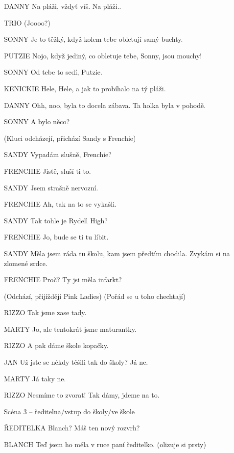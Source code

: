 DANNY                Na pláži, vždyť víš. Na pláži..

TRIO                (Joooo?)

SONNY                Je to těžký, když kolem tebe obletují samý buchty.

PUTZIE                Nojo, když jediný, co obletuje tebe, Sonny, jsou mouchy!

SONNY                Od tebe to sedí, Putzie.

KENICKIE                Hele, Hele, a jak to probíhalo na tý pláži. 

DANNY                Ohh, noo, byla to docela zábava. Ta holka byla v pohodě.

SONNY                A bylo něco?

(Kluci odcházejí, přichází Sandy s Frenchie)





SANDY                Vypadám slušně, Frenchie?

FRENCHIE                Jistě, sluší ti to.

SANDY                Jsem strašně nervozní.

FRENCHIE                Ah, tak na to se vykašli.

SANDY                Tak tohle je Rydell High?

FRENCHIE                Jo, bude se ti tu líbit.

SANDY                Měla jsem ráda tu školu, kam jsem předtím chodila. Zvykám si na                         zlomené srdce.

FRENCHIE                Proč? Ty jsi měla infarkt?

(Odchází, přijíždějí Pink Ladies) (Pořád se u toho chechtají)

RIZZO                Tak jsme zase tady.

MARTY                Jo, ale tentokrát jsme maturantky.

RIZZO                A pak dáme škole kopačky.

JAN                Už jste se někdy těšili tak do školy? Já ne.

MARTY                Já taky ne.

RIZZO                Nesmíme to zvorat! Tak dámy, jdeme na to.

Scéna 3 – ředitelna/vstup do školy/ve škole 

ŘEDITELKA                Blanch? Máš ten nový rozvrh?

BLANCH                 Teď jsem ho měla v ruce paní ředitelko. (olizuje si prsty)

